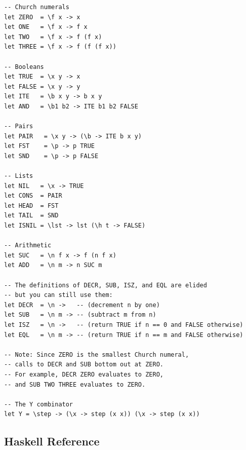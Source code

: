 \documentclass[addpoints]{exam}
\begin{document}
\begin{verbatim}
-- Church numerals
let ZERO  = \f x -> x
let ONE   = \f x -> f x
let TWO   = \f x -> f (f x)
let THREE = \f x -> f (f (f x))

-- Booleans
let TRUE  = \x y -> x
let FALSE = \x y -> y
let ITE   = \b x y -> b x y
let AND   = \b1 b2 -> ITE b1 b2 FALSE

-- Pairs
let PAIR   = \x y -> (\b -> ITE b x y)
let FST    = \p -> p TRUE
let SND    = \p -> p FALSE

-- Lists
let NIL   = \x -> TRUE
let CONS  = PAIR
let HEAD  = FST
let TAIL  = SND
let ISNIL = \lst -> lst (\h t -> FALSE)

-- Arithmetic
let SUC   = \n f x -> f (n f x)
let ADD   = \n m -> n SUC m

-- The definitions of DECR, SUB, ISZ, and EQL are elided
-- but you can still use them:
let DECR  = \n ->   -- (decrement n by one)
let SUB   = \n m -> -- (subtract m from n)
let ISZ   = \n ->   -- (return TRUE if n == 0 and FALSE otherwise)
let EQL   = \n m -> -- (return TRUE if n == m and FALSE otherwise)

-- Note: Since ZERO is the smallest Church numeral,
-- calls to DECR and SUB bottom out at ZERO.
-- For example, DECR ZERO evaluates to ZERO,
-- and SUB TWO THREE evaluates to ZERO.

-- The Y combinator
let Y = \step -> (\x -> step (x x)) (\x -> step (x x))
\end{verbatim}

\newpage

\subsection*{Haskell Reference}
\end{document}
